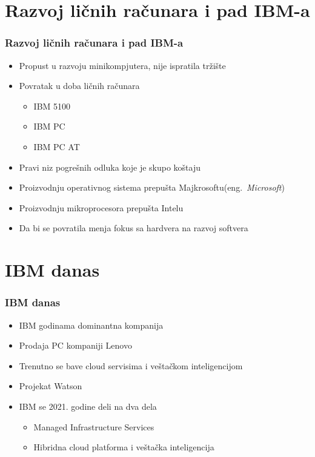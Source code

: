 \documentclass{beamer}
\begin{document}
\section{Razvoj ličnih računara i pad IBM-a}
\begin{frame}[fragile]\frametitle{Razvoj ličnih računara i pad IBM-a}
	\begin{itemize}
	\item Propust u razvoju minikompjutera, nije ispratila tržište
	\item Povratak u doba ličnih računara
	\begin{itemize}
	\item IBM 5100
	\item IBM PC
	\item IBM PC AT
	\end{itemize}
	\item Pravi niz pogrešnih odluka koje je skupo koštaju
	\item Proizvodnju operativnog sistema prepušta Majkrosoftu(eng.~{\em Microsoft})
	\item Proizvodnju mikroprocesora prepušta Intelu
	\item Da bi se povratila menja fokus sa hardvera na razvoj softvera
	\end{itemize}
\end{frame}



\section{IBM danas}

\begin{frame}[fragile]\frametitle{IBM danas}
	\begin{itemize}	
		\item IBM godinama dominantna kompanija
		\item Prodaja PC kompaniji Lenovo 
		\item Trenutno se bave cloud servisima i veštačkom inteligencijom
            \item Projekat Watson
            \item IBM se 2021. godine deli na dva dela
            \begin{itemize}
	       \item Managed Infrastructure Services
	       \item Hibridna cloud platforma i veštačka inteligencija
	    \end{itemize}
            
	\end{itemize}
\end{frame}
\end{document}
